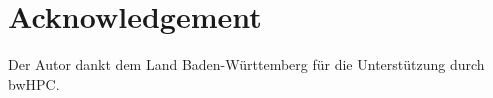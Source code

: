 \chapter*{Acknowledgement}


Der Autor dankt dem Land Baden-Württemberg für die Unterstützung durch bwHPC.